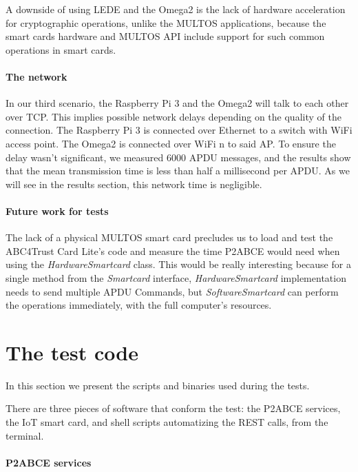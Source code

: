 A downside of using LEDE and the Omega2 is the lack of hardware acceleration for cryptographic operations, unlike the MULTOS applications, because the smart cards hardware and MULTOS API include support for such common operations in smart cards.



\paragraph{The network} In our third scenario, the Raspberry Pi 3 and the Omega2 will talk to each other over TCP. This implies possible network delays depending on the quality of the connection. The Raspberry Pi 3 is connected over Ethernet to a switch with WiFi access point. The Omega2 is connected over WiFi n to said AP. To ensure the delay wasn't significant, we measured 6000 APDU messages, and the results show that the mean transmission time is less than half a millisecond per APDU. As we will see in the results section, this network time is negligible.

\paragraph{Future work for tests} The lack of a physical MULTOS smart card precludes us to load and test the ABC4Trust Card Lite's code and measure the time P2ABCE would need when using the \textit{HardwareSmartcard} class. This would be really interesting because for a single method from the \textit{Smartcard} interface, \textit{HardwareSmartcard} implementation needs to send multiple APDU Commands, but \textit{SoftwareSmartcard} can perform the operations immediately, with the full computer's resources.




\section{The test code}

In this section we present the scripts and binaries used during the tests.

There are three pieces of software that conform the test: the P2ABCE services, the IoT smart card, and shell scripts automatizing the REST calls, from the terminal.

\paragraph{P2ABCE services}\hfil

